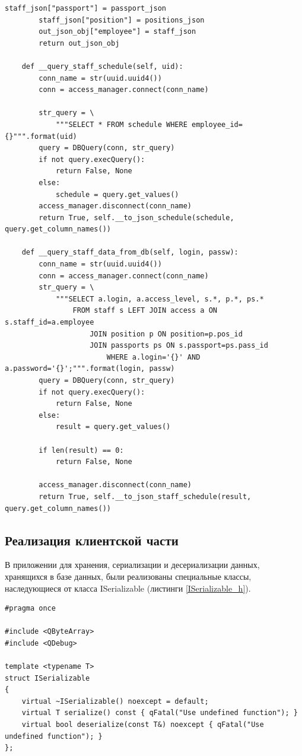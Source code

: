 \documentclass[a4paper,14pt]{article}
\begin{document}
\begin{lstlisting}[label=auth_handler,caption=\text{AuthHandler.py.}]
		staff_json["passport"] = passport_json
		staff_json["position"] = positions_json
		out_json_obj["employee"] = staff_json
		return out_json_obj
	
	def __query_staff_schedule(self, uid):
		conn_name = str(uuid.uuid4())
		conn = access_manager.connect(conn_name)
	
		str_query = \
			"""SELECT * FROM schedule WHERE employee_id={}""".format(uid)
		query = DBQuery(conn, str_query)
		if not query.execQuery():
			return False, None
		else:
			schedule = query.get_values()
		access_manager.disconnect(conn_name)
		return True, self.__to_json_schedule(schedule, query.get_column_names())	
	
	def __query_staff_data_from_db(self, login, passw):
		conn_name = str(uuid.uuid4())
		conn = access_manager.connect(conn_name)
		str_query = \
			"""SELECT a.login, a.access_level, s.*, p.*, ps.* 
				FROM staff s LEFT JOIN access a ON s.staff_id=a.employee 
					JOIN position p ON position=p.pos_id 
					JOIN passports ps ON s.passport=ps.pass_id 
						WHERE a.login='{}' AND a.password='{}';""".format(login, passw)
		query = DBQuery(conn, str_query)
		if not query.execQuery():
			return False, None
		else:
			result = query.get_values()
	
		if len(result) == 0:
			return False, None
	
		access_manager.disconnect(conn_name)
		return True, self.__to_json_staff_schedule(result, query.get_column_names())	
\end{lstlisting}

\subsection{Реализация клиентской части}

В приложении для хранения, сериализации и десериализации данных, хранящихся в базе данных, были реализованы специальные классы, наследующиеся от класса ISerializable (листинги \ref{ISerializable_h}). 

\begin{lstlisting}[label=ISerializable_h,caption=\text{ISerializable.h.}]
#pragma once

#include <QByteArray>
#include <QDebug>
	
template <typename T>
struct ISerializable
{
	virtual ~ISerializable() noexcept = default;
	virtual T serialize() const { qFatal("Use undefined function"); }
	virtual bool deserialize(const T&) noexcept { qFatal("Use undefined function"); }
};	
\end{lstlisting}
\end{document}
